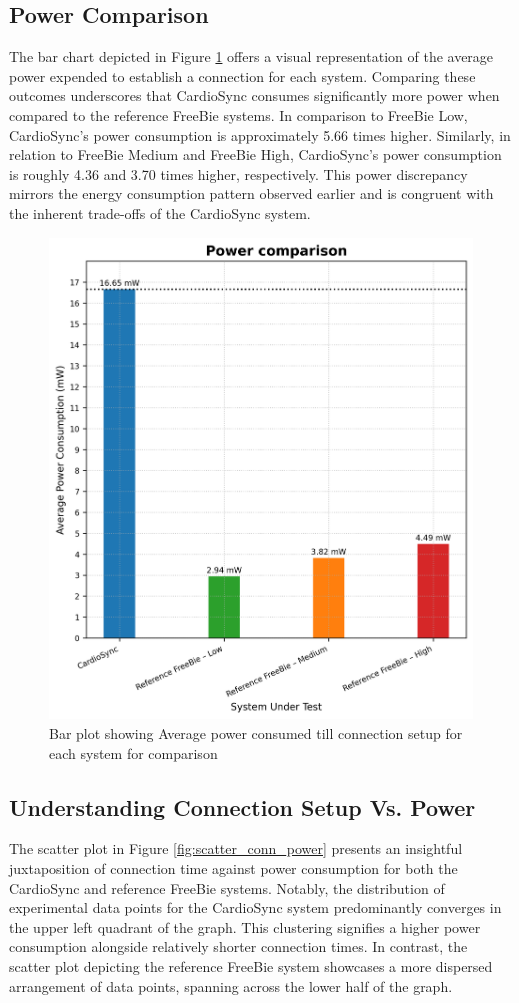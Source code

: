 \subsection{Power Comparison}
The bar chart depicted in Figure \ref{fig:power_comp} offers a visual representation of the average power expended to establish a connection for each system. Comparing these outcomes underscores that CardioSync consumes significantly more power when compared to the reference FreeBie systems. In comparison to FreeBie Low, CardioSync's power consumption is approximately 5.66 times higher. Similarly, in relation to FreeBie Medium and FreeBie High, CardioSync's power consumption is roughly 4.36 and 3.70 times higher, respectively. This power discrepancy mirrors the energy consumption pattern observed earlier and is congruent with the inherent trade-offs of the CardioSync system.

\begin{figure}[H]
    \centering
    \includegraphics[width=0.7\linewidth]{chapters/Results/Power_comparison.png}
    \caption{Bar plot showing Average power consumed till connection setup for each system for comparison}
    \label{fig:power_comp}
\end{figure}

\subsection{Understanding Connection Setup Vs. Power}
The scatter plot in Figure \ref{fig:scatter_conn_power} presents an insightful juxtaposition of connection time against power consumption for both the CardioSync and reference FreeBie systems. Notably, the distribution of experimental data points for the CardioSync system predominantly converges in the upper left quadrant of the graph. This clustering signifies a higher power consumption alongside relatively shorter connection times. In contrast, the scatter plot depicting the reference FreeBie system showcases a more dispersed arrangement of data points, spanning across the lower half of the graph.

